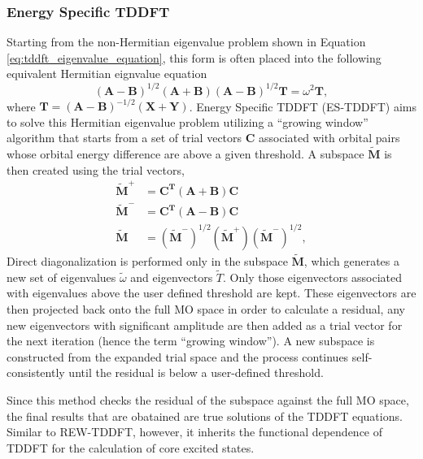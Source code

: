 \documentclass{article}
\begin{document}
\subsubsection{Energy Specific TDDFT}
Starting from the non-Hermitian eigenvalue problem shown in Equation \ref{eq:tddft_eigenvalue_equation}, this form is often placed into the following equivalent Hermitian eignvalue equation
\begin{equation}
(\mathbf{A} - \mathbf{B})^{1/2} (\mathbf{A} +\mathbf{B}) (\mathbf{A} - \mathbf{B})^{1/2} \mathbf{T} = \omega^2 \mathbf{T},
\end{equation}
where $\mathbf{T} = (\mathbf{A} - \mathbf{B})^{-1/2} (\mathbf{X} + \mathbf{Y})$. Energy Specific TDDFT (ES-TDDFT) \cite{lestrange_calibration_2015} aims to solve this Hermitian eigenvalue problem utilizing a ``growing window'' algorithm that starts from a set of trial vectors $\mathbf{C}$ associated with orbital pairs whose orbital energy difference are above a given threshold. A subspace $\mathbf{\tilde{M}}$ is then created using the trial vectors,
\begin{align}
\mathbf{\tilde{M}}^+ &= \mathbf{C^T} (\mathbf{A} +\mathbf{B})\mathbf{C} \\
\mathbf{\tilde{M}}^- &= \mathbf{C^T} (\mathbf{A} -\mathbf{B})\mathbf{C} \\
\mathbf{\tilde{M}} &= (\mathbf{\tilde{M}} ^-)^{1/2} (\mathbf{\tilde{M}} ^+) (\mathbf{\tilde{M}}^-)^{1/2},
\end{align}
Direct diagonalization is performed only in the subspace $\mathbf{\tilde{M}}$, which generates a new set of eigenvalues $\tilde{\omega}$ and eigenvectors $\tilde{T}$. Only those eigenvectors associated with eigenvalues above the user defined threshold are kept. These eigenvectors are then projected back onto the full MO space in order to calculate a residual, any new eigenvectors with significant amplitude are then added as a trial vector for the next iteration (hence the term ``growing window''). A new subspace is constructed from the expanded trial space and the process continues self-consistently until the residual is below a user-defined threshold.

Since this method checks the residual of the subspace against the full MO space, the final results that are obatained are true solutions of the TDDFT equations. Similar to REW-TDDFT, however, it inherits the functional dependence of TDDFT for the calculation of core excited states.
\end{document}
